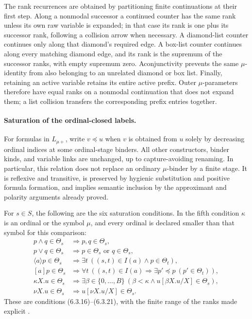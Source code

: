 The rank recurrences are obtained by partitioning
finite continuations at their first step. Along a
nonmodal successor a continued counter has the same
rank unless its own raw variable is expanded; in
that case its rank is one plus its successor rank,
following a collision arrow when necessary. A
diamond-list counter continues only along that
diamond's required edge. A box-list counter continues
along every matching diamond edge, and its rank is
the supremum of the successor ranks, with empty
supremum zero. Aconjunctivity prevents the same
\(\mu\)-identity from also belonging to an
unrelated diamond or box list. Finally, retaining an
active variable retains its entire active prefix.
Outer \(\mu\)-parameters therefore have equal
ranks on a nonmodal continuation that does not
expand them; a list collision transfers the
corresponding prefix entries together.

\paragraph{Saturation of the ordinal-closed labels.}
For formulas in \(L_{\mu+}\), write \(v\preceq u\)
when \(v\) is obtained from \(u\) solely by decreasing
ordinal indices at some ordinal-stage binders.
All other constructors, binder kinds, and variable
links are unchanged, up to capture-avoiding renaming.
In particular, this relation does not replace an
ordinary \(\mu\)-binder by a finite stage. It is
reflexive and transitive, is preserved by hygienic
substitution and positive formula formation, and
implies semantic inclusion by the approximant and
polarity arguments already proved.

For \(s\in S\), the following are the six
saturation conditions. In the fifth condition
\(\kappa\) is an ordinal or the symbol \(\mu\),
and every ordinal is declared smaller than that
symbol for this comparison:
\[
\begin{aligned}
 p\land q\in\Theta_s
   &\Longrightarrow p,q\in\Theta_s,\\
 p\lor q\in\Theta_s
   &\Longrightarrow p\in\Theta_s\text{ or }q\in\Theta_s,\\
 \langle a\rangle p\in\Theta_s
   &\Longrightarrow
      \exists t\ ((s,t)\in I(a)\land p\in\Theta_t),\\
 [a]p\in\Theta_s
   &\Longrightarrow
      \forall t\ ((s,t)\in I(a)\Rightarrow
         \exists p'\preceq p\ (p'\in\Theta_t)),\\
 \kappa X.u\in\Theta_s
   &\Longrightarrow
      \exists\beta\in\{0,\ldots,B\}\
        (\beta<\kappa\land u[\beta X.u/X]\in\Theta_s),\\
 \nu X.u\in\Theta_s
   &\Longrightarrow u[\nu X.u/X]\in\Theta_s.
\end{aligned}
\]
These are conditions (6.3.16)--(6.3.21), with the
finite range of the ranks made explicit
\cite[pp.~350--351]{Kozen1983}.

